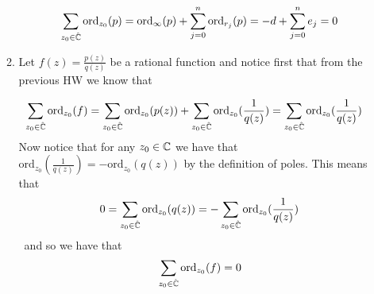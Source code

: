 \documentclass[12pt]{amsart}
\begin{document}
\begin{enumerate}
\begin{enumerate}
\begin{align*}
    \sum_{z_0\in \hat{\mathbb{C}}} \text{ord}_{z_0}(p)=\text{ord}_{\infty}(p)+\sum_{j=0}^n\text{ord}_{r_j}(p)=-d+\sum_{j=0}^n e_j=0
\end{align*}

\item Let $f(z)=\frac{p(z)}{q(z)}$ be a rational function and notice first that from the previous HW we know that

\begin{align*}
    \sum_{z_0\in \hat{\mathbb{C}}} \text{ord}_{z_0}(f)&=\sum_{z_0\in \hat{\mathbb{C}}} \text{ord}_{z_0}(p(z))+\sum_{z_0\in \hat{\mathbb{C}}}\text{ord}_{z_0}(\frac{1}{q(z)})=\sum_{z_0\in \hat{\mathbb{C}}}\text{ord}_{z_0}(\frac{1}{q(z)})
\end{align*}
Now notice that for any $z_0\in \mathbb{C}$ we have that $\text{ord}_{z_0}(\frac{1}{q(z)})=-\text{ord}_{z_0}(q(z))$ by the definition of poles. This means that $$0=\sum_{z_0\in \hat{\mathbb{C}}}\text{ord}_{z_0}(q(z))=-\sum_{z_0\in \hat{\mathbb{C}}}\text{ord}_{z_0}(\frac{1}{q(z)})$$\
and so we have that
$$\sum_{z_0\in \hat{\mathbb{C}}} \text{ord}_{z_0}(f)=0$$

\end{enumerate}
\end{enumerate}
\end{document}
